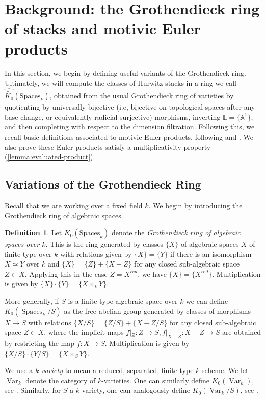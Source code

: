 \documentclass[12 pt]{amsart}
\newcommand{\rboxed}[1]{#1}
\theoremstyle{plain}
\theoremstyle{definition}
\newtheorem{definition}[theorem]{Definition}
\theoremstyle{remark}
\numberwithin{equation}{section}
\newcommand\ba{\mathbb A}
\newcommand\bl{\mathbb L}
\newcommand\grSpaces{K_0(\mathrm{Spaces}_k)} %
\newcommand\grcSpaces{\widehat{\widetilde{K_0}}(\mathrm{Spaces}_k)} %
\newcommand{\on}[1]{\operatorname{#1}}
\begin{document}
\section{Background: the Grothendieck ring of stacks and motivic Euler
products} 
\label{section:background}

In this section, we begin by defining useful variants of the Grothendieck ring.
Ultimately, we will compute the classes of Hurwitz stacks
in a ring we call $\grcSpaces$, 
obtained from the usual Grothendieck ring
of varieties by quotienting by universally bijective (i.e, 
	bijective on topological spaces after any base change,
	or equivalently	radicial surjective) morphisms, inverting $\bl =
\{\ba^1\}$, and then completing with respect to the dimension filtration.
Following this, we recall basic definitions associated to motivic Euler
products,
following \cite{bilu:thesis} and
\cite{biluH:motivic-euler-products-in-motivic-statistics}.
We also prove these Euler products satisfy a multiplicativity property
(\autoref{lemma:evaluated-product}).
	

\subsection{Variations of the Grothendieck Ring}
\label{subsection:grothendieck-ring-definitions}


Recall that we are working over a fixed field $k$.
We begin by introducing the Grothendieck ring of algebraic spaces.

\begin{definition} \label{definition:grspaces}Let  $\rboxed{\grSpaces}$  denote the {\em
	Grothendieck ring of algebraic spaces over $k$}.  This is the ring
	generated by classes $\{X\}$ of algebraic spaces $X$  of finite type over $k$ with
	relations given by $\{X\} = \{Y\}$ if there is an isomorphism $X \simeq Y$
	over $k$ and $\{X\} = \{Z\} + \{X-Z\}$ for any closed
        sub-algebraic space $Z  \subset X$.  Applying this in the case
        $Z = X^{red}$, we have $\{X\} = \{X^{red}\}$.        
Multiplication is given by $\{X\} \cdot \{Y\} = \{X \times_k Y\}$. 

More generally, if $S$ is a finite type algebraic space over $k$
we can define $K_0(\on{Spaces}_k/S)$
as the free abelian group generated by
classes of morphisms $X \to S$ with relations $\{X/S\} = \{Z/S\} + \{X - Z/S\}$ 
for any closed sub-algebraic space $Z \subset X$,
where the
implicit maps $f|_Z: Z \to S, f|_{X-Z} : X - Z \to S$ are obtained by
restricting the map $f: X \to S$. 
Multiplication is given by $\{X/S\} \cdot \{Y/S\} = \{X \times_S Y\}$. 

We use a {\em $k$-variety} to mean a reduced, separated, finite type
$k$-scheme. We let $\on{Var}_k$ denote the category of $k$-varieties.
One can similarly define 
$K_0(\on{Var}_k),$ see \cite[\S2]{biluH:motivic-euler-products-in-motivic-statistics}. 
Similarly, for $S$ a $k$-variety, one can analogously define
$K_0(\on{Var}_k/S)$, see \cite[\S2]{biluH:motivic-euler-products-in-motivic-statistics}. 
\end{definition}
\end{document}
